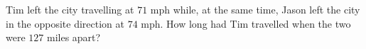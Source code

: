 Tim left the city travelling at $71$ mph while, at the same time, Jason left the city in the opposite direction at $74$ mph. How long had Tim travelled when the two were $127$ miles apart?
